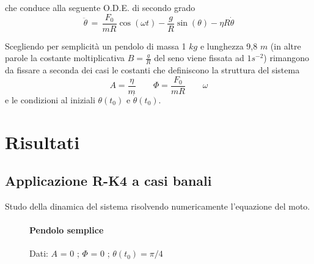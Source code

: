 \documentclass[11pt]{article}
\begin{document}
che conduce alla seguente O.D.E. di secondo grado
	\begin{equation}
\ddot{\theta} \, = \, \dfrac{F_{0}}{mR}\cos(\omega t) - \dfrac{g}{R}\sin(\theta) -\eta R \dot{\theta}
	\end{equation}

Scegliendo per semplicità un pendolo di massa 1 $kg$ e lunghezza 9,8 $m$ (in altre parole la costante moltiplicativa $B=\frac{g}{R}$ del seno viene fissata ad $ 1 s^{-2}$) rimangono da fissare a seconda dei casi le costanti che definiscono la struttura del sistema
	\begin{displaymath}
	A= \dfrac{\eta}{m} \qquad \Phi = \dfrac{F_{0}}{mR} \qquad \omega  
	\end{displaymath}
e le condizioni al iniziali $\theta (t_{0})$ e $\dot{\theta}(t_{0})$.


\clearpage
\section{Risultati}

\subsection{Applicazione R-K4 a casi banali}
Studo della dinamica del sistema risolvendo numericamente l'equazione del moto.
\begin{figure}[!h]
\caption{}
\paragraph{Pendolo semplice}

Dati: $A$ = 0 ; $\Phi$ = 0 ; $\theta(t_{0}) = \pi /4$ 
\centering
{}\,
\end{figure}
\end{document}
